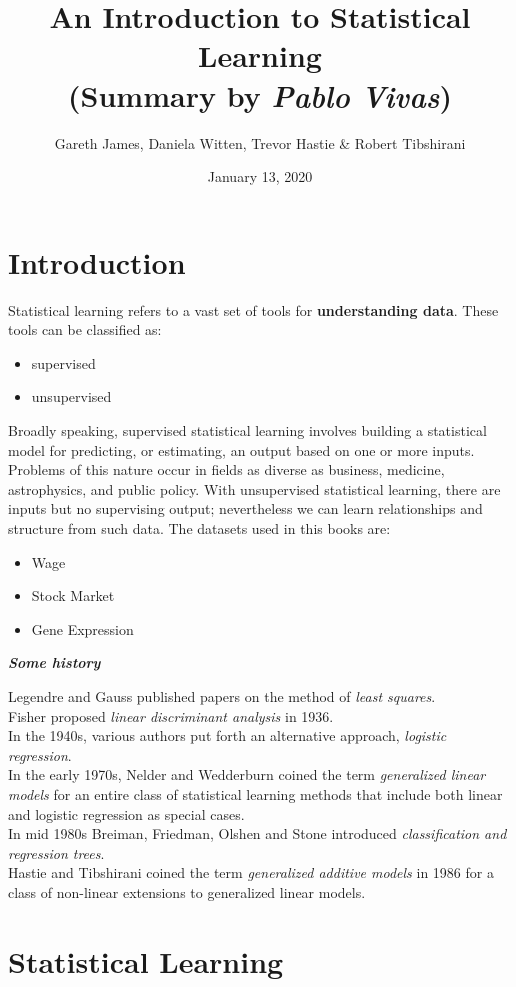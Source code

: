\documentclass[12pt,a4paper]{article}
\author{Gareth James, Daniela Witten, Trevor Hastie \& Robert Tibshirani}
\title{An Introduction to Statistical Learning\\
\large{(Summary by \textit{Pablo Vivas})}}
\date{January 13, 2020}
\begin{document}
\maketitle
\section{Introduction}
Statistical learning refers to a vast set of tools for \textbf{understanding data}. These tools can be classified as:
\begin{itemize}
\item supervised 
\item unsupervised
\end{itemize}
Broadly speaking, supervised statistical learning involves building a statistical model for predicting, or estimating, an output based on one or more inputs. Problems of this nature occur in fields as diverse as business, medicine, astrophysics, and public policy. With unsupervised statistical learning, there are inputs but no supervising output; nevertheless we can learn relationships and structure from such data.
The datasets used in this books are:
\begin{itemize}
\item Wage 
\item Stock Market
\item Gene Expression
\end{itemize}

\textbf{\textit{Some history}}
\begin{framed}
Legendre and Gauss published papers on the method of \textit{least squares}.\\
Fisher proposed \textit{linear discriminant analysis} in 1936.\\
In the 1940s, various authors put forth an alternative approach, \textit{logistic regression}.\\
In the early 1970s, Nelder and Wedderburn coined the term \textit{generalized linear models} for an entire class of statistical learning methods that include both linear and logistic regression as special cases.\\ 
In mid 1980s Breiman, Friedman, Olshen and Stone introduced \textit{classiﬁcation and regression trees}.\\
Hastie and Tibshirani coined the term \textit{generalized additive models} in 1986 for a class of non-linear extensions to generalized linear models. 
\end{framed}
\section{Statistical Learning}
\end{document}

